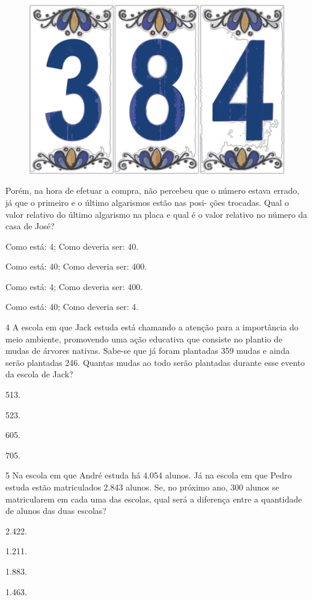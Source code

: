 \begin{figure}[htpb!]
\centering
\includegraphics[width=.3\textwidth]{./media/image92.png}
\end{figure}


Porém, na hora de efetuar a compra, não percebeu que o número
estava errado, já que o primeiro e o último algarismos estão nas posi-
ções trocadas. Qual o valor relativo do último algarismo na placa e qual é o valor relativo no número da casa de José?

\begin{escolha}
\item
  Como está: 4; Como deveria ser: 40.
\item
  Como está: 40; Como deveria ser: 400.
\item
  Como está: 4; Como deveria ser: 400.
\item
  Como está: 40; Como deveria ser: 4.
\end{escolha}


\num{4} A escola em que Jack estuda está chamando a atenção para a importância do meio ambiente, promovendo uma ação educativa que consiste no plantio de mudas de árvores
nativas. Sabe-se que já foram plantadas 359 mudas e ainda serão
plantadas 246. Quantas mudas ao todo serão plantadas durante esse evento
da escola de Jack?

\begin{escolha}
\item
  513.
\item
  523.
\item
  605.
\item
  705.
\end{escolha}

\num{5} Na escola em que André estuda há 4.054 alunos. Já na escola em que
Pedro estuda estão matriculados 2.843 alunos. Se, no próximo ano, 300
alunos se matricularem em cada uma das escolas, qual será a diferença
entre a quantidade de alunos das duas escolas?

\begin{escolha}
\item
  2.422.
\item
  1.211.
\item
  1.883.
\item
  1.463.
\end{escolha}

